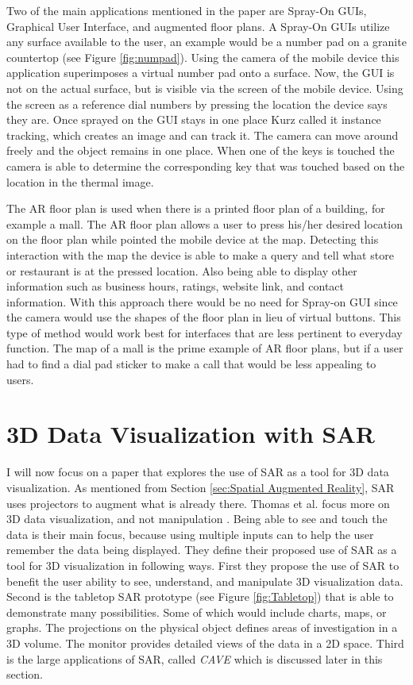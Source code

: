 \documentclass{sig-alternate}
\begin{document}
Two of the main applications mentioned in the paper are Spray-On GUIs, Graphical User Interface, and augmented floor plans. A Spray-On GUIs utilize any surface available to the user, an example would be a number pad on a granite countertop (see Figure \ref{fig:numpad}). Using the camera of the mobile device this application superimposes a virtual number pad onto a surface. Now, the GUI is not on the actual surface, but is visible via the screen of the mobile device. Using the screen as a reference dial numbers by pressing the location the device says they are. Once sprayed on the GUI stays in one place Kurz called it instance tracking, which creates an image and can track it. The camera can move around freely and the object remains in one place. When one of the keys is touched the camera is able to determine the corresponding key that was touched based on the location in the thermal image. 

The AR floor plan is used when there is a printed floor plan of a building, for example a mall. The AR floor plan allows a user to press his/her desired location on the floor plan while pointed the mobile device at the map. Detecting this interaction with the map the device is able to make a query and tell what store or restaurant is at the pressed location. Also being able to display other information such as business hours, ratings, website link, and contact information. With this approach there would be no need for Spray-on GUI since the camera would use the shapes of the floor plan in lieu of virtual buttons. This type of method would work best for interfaces that are less pertinent to everyday function. The map of a mall is the prime example of AR floor plans, but if a user had to find a dial pad sticker to make a call that would be less appealing to users.      


\section{3D Data Visualization with SAR}
\label{sec:3D Data Visualization}
I will now focus on a paper that explores the use of SAR as a tool for 3D data visualization. As mentioned from Section \ref{sec:Spatial Augmented Reality}, SAR uses projectors to augment what is already there. Thomas et al. focus more on 3D data visualization, and not manipulation \cite{3D}. Being able to see and touch the data is their main focus, because using multiple inputs can to help the user remember the data being displayed. They define their proposed use of SAR as a tool for 3D visualization in following ways. First they propose the use of SAR to benefit the user ability to see, understand, and manipulate 3D visualization data. Second is the tabletop SAR prototype (see Figure \ref{fig:Tabletop}) that is able to demonstrate many possibilities. Some of which would include charts, maps, or graphs. The projections on the physical object defines areas of investigation in a 3D volume. The monitor provides detailed views of the data in a 2D space. Third is the large applications of SAR, called \textit{CAVE} which is discussed later in this section.
\end{document}

